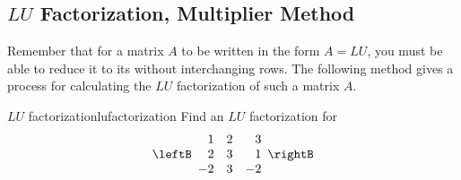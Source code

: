 \subsection{$LU$ Factorization, Multiplier Method}

Remember that for a matrix $A$ to be written in the form $A=LU$, you must be able to reduce it to its \ef\; without interchanging rows. The following method gives a process for calculating the $LU$ factorization of such a matrix $A$. 

\begin{example}{$LU$ factorization}{lufactorization}
Find an $LU$ factorization for 
\begin{equation*}
\leftB 
\begin{array}{rrr}
1 & 2 & 3 \\ 
2 & 3 & 1 \\ 
-2 & 3 & -2
\end{array}
\rightB
\end{equation*}
\end{example}

